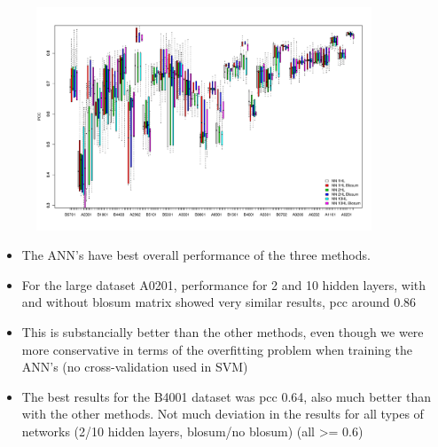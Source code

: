 \documentclass[presentation]{beamer}   %
\begin{document}
\begin{frame}
\begin{figure}[ht]
\begin{center}
\includegraphics[width=10cm]{fig/annBX1.pdf}
\end{center}
\end{figure}
\end{frame}

\begin{frame}
\begin{itemize}
\item<1> The ANN's have best overall performance of the three methods.
\item<2> For the large dataset A0201, performance for 2 and 10 hidden layers, with and without blosum matrix showed very similar results, pcc around 0.86
\item<3> This is substancially better than the other methods, even though we were more conservative in terms of the overfitting problem when training the ANN's (no cross-validation used in SVM)
\item<4> The best results for the B4001 dataset was pcc 0.64, also much better than with the other methods. Not much deviation in the results for all types of networks (2/10 hidden layers, blosum/no blosum) (all >= 0.6)
\end{itemize}
\end{frame}
\end{document}

